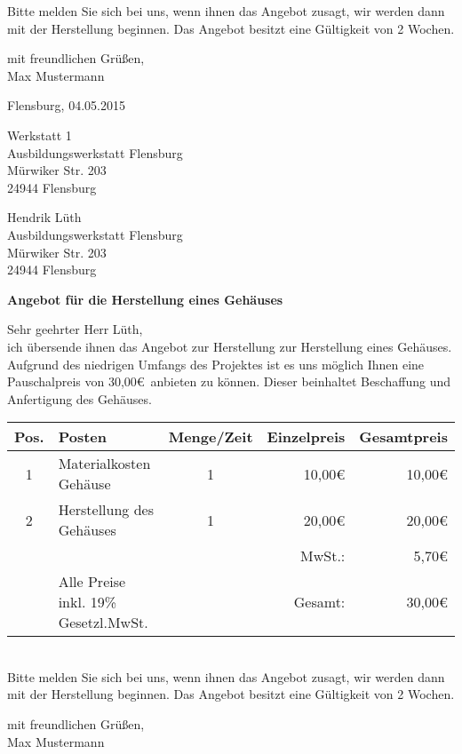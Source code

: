 \begin{flushleft}
Bitte melden Sie sich bei uns, wenn ihnen das Angebot zusagt, wir werden dann mit der Herstellung beginnen. Das Angebot besitzt eine Gültigkeit von 2 Wochen.
\bigskip

mit freundlichen Grüßen,\\
\bigskip
Max Mustermann
\end{flushleft}
\pagebreak
Flensburg, 04.05.2015
\begin{flushright}
Werkstatt 1\\
Ausbildungswerkstatt Flensburg\\
Mürwiker Str. 203\\
24944 Flensburg
\end{flushright}
\bigskip
\bigskip
\bigskip
Hendrik Lüth\\
Ausbildungswerkstatt Flensburg\\
Mürwiker Str. 203\\
24944 Flensburg\\
\begin{flushleft}
\bigskip

\textbf{Angebot für die Herstellung eines Gehäuses}
\bigskip
\bigskip

Sehr geehrter Herr Lüth,\\
\bigskip
ich übersende ihnen das Angebot zur Herstellung zur Herstellung eines Gehäuses.\\
Aufgrund des niedrigen Umfangs des Projektes ist es uns möglich Ihnen eine Pauschalpreis von 30,00\euro\ anbieten zu können. Dieser beinhaltet Beschaffung und Anfertigung des Gehäuses.\\
\bigskip
\begin{tabular}{cp{7cm}cr|r|}
\hline
\multicolumn{1}{|l|}{Pos.} & \multicolumn{1}{l|}{Posten} & \multicolumn{1}{l|}{Menge/Zeit} & Einzelpreis & Gesamtpreis \\ \hline
\multicolumn{1}{|c|}{1} & \multicolumn{1}{l|}{Materialkosten Gehäuse} & \multicolumn{1}{c|}{1} & 10,00\euro & 10,00\euro \\ \hline
\multicolumn{1}{|c|}{2} & \multicolumn{1}{l|}{Herstellung des Gehäuses} & \multicolumn{1}{c|}{1} & 20,00\euro & 20,00\euro \\ \hline
 & & & MwSt.: & 5,70\euro \\ \cline{5-5}
                       & Alle Preise inkl. 19\% Gesetzl.MwSt. &                       & Gesamt: & 30,00\euro \\ \cline{5-5} 
\end{tabular}\\
\bigskip
Bitte melden Sie sich bei uns, wenn ihnen das Angebot zusagt, wir werden dann mit der Herstellung beginnen. Das Angebot besitzt eine Gültigkeit von 2 Wochen.
\bigskip

mit freundlichen Grüßen,\\
\bigskip
Max Mustermann
\end{flushleft}